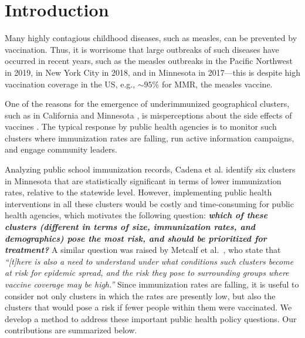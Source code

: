 \section{Introduction}
Many highly contagious childhood diseases, such as measles, can be prevented by
vaccination. Thus, it is worrisome that large outbreaks of such diseases 
have occurred in recent years, such as the measles
outbreaks in the Pacific Northwest in 2019, in New York City in 2018, and in Minnesota in 2017---this is
despite high vaccination coverage in the US, e.g., $\sim 95\%$ for MMR, the measles vaccine.


One of the reasons for the emergence of underimmunized geographical clusters, such as in California \cite{lieu2015geographic}
and Minnesota \cite{cadena:vacc-cluster}, is misperceptions about the
side effects of vaccines \cite{atwell:pediatrics13}. The typical response by public health agencies is to monitor such clusters where immunization rates are falling, run active information campaigns, and engage community leaders. 

Analyzing public school immunization records, Cadena et al. \cite{cadena:vacc-cluster} identify six clusters in Minnesota that are statistically significant in terms of lower immunization rates, relative to the statewide level. However, implementing public health interventions in all these clusters would be costly and time-consuming for
public health agencies, which motivates the following question: \textbf{\emph{which of these clusters (different
in terms of size, immunization rates, and demographics) pose the most risk, and should be prioritized for treatment?}}
A similar question was raised by Metcalf et al.~\cite{metcalf:epidemics15}, who state that \emph{``[t]here is also a need to understand under what conditions such clusters become at 
risk for epidemic spread, and the risk they pose to surrounding groups where vaccine coverage may be high.''} 
Since immunization rates are falling, it is useful to consider not only clusters in which the rates are presently low, but also the clusters that would pose a risk if fewer people within them were vaccinated.
We develop a method to address these important public health policy questions. Our contributions are summarized below.
\smallskip


